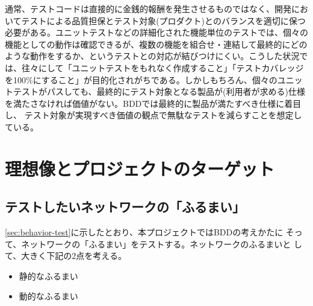 通常、テストコードは直接的に金銭的報酬を発生させるものではなく、開発にお
いてテストによる品質担保とテスト対象(プロダクト)とのバランスを適切に保つ
必要がある。ユニットテストなどの詳細化された機能単位のテストでは、個々の
機能としての動作は確認できるが、複数の機能を組合せ・連結して最終的にどの
ような動作をするか、というテストとの対応が結びつけにくい。こうした状況で
は、往々にして「ユニットテストをもれなく作成すること」「テストカバレッジ
を100\%にすること」が目的化されがちである。しかしもちろん、個々のユニッ
トテストがパスしても、最終的にテスト対象となる製品が(利用者が求める)仕様
を満たさなければ価値がない。BDDでは最終的に製品が満たすべき仕様に着目し、
テスト対象が実現すべき価値の観点で無駄なテストを減らすことを想定している。

 \section{理想像とプロジェクトのターゲット}
 \label{sec:desired-and-target}


  \subsection{テストしたいネットワークの「ふるまい」}
  \label{sec:behavior-to-test}

\ref{sec:behavior-test}に示したとおり、本プロジェクトではBDDの考えかたに
そって、ネットワークの「ふるまい」をテストする。ネットワークのふるまいと
して、大きく下記の2点を考える。
\begin{itemize}
 \item 静的なふるまい
 \item 動的なふるまい
\end{itemize}

